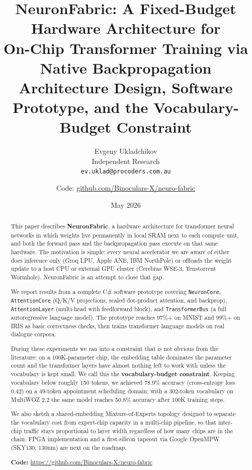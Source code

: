 \documentclass[11pt]{article}
\title{\textbf{NeuronFabric: A Fixed-Budget Hardware Architecture for\\
On-Chip Transformer Training via Native Backpropagation}\\[0.5em]
\large Architecture Design, Software Prototype, and the Vocabulary-Budget Constraint}
\author{
  Evgeny Ukladchikov \\
  Independent Research \\
  \texttt{ev.uklad@procoders.com.au} \\
  \and
  Code: \href{https://github.com/Binoculars-X/neuro-fabric}{github.com/Binoculars-X/neuro-fabric}
}
\date{May 2026}
\begin{document}
\maketitle

\begin{abstract}
This paper describes \textbf{NeuronFabric}, a hardware architecture for transformer
neural networks in which weights live permanently in local SRAM next to each compute
unit, and both the forward pass and the backpropagation pass execute on that same
hardware. The motivation is simple: every neural accelerator we are aware of either
does inference only (Groq LPU, Apple ANE, IBM NorthPole) or offloads the weight
update to a host CPU or external GPU cluster (Cerebras WSE-3, Tenstorrent Wormhole).
NeuronFabric is an attempt to close that gap.

We report results from a complete C\# software prototype covering \texttt{NeuronCore},
\texttt{AttentionCore} (Q/K/V projections, scaled dot-product attention, and backprop),
\texttt{AttentionLayer} (multi-head with feedforward block), and \texttt{TransformerBus}
(a full autoregressive language model). The prototype reaches 97\%+ on MNIST and
99\%+ on IRIS as basic correctness checks, then trains transformer language models
on real dialogue corpora.

During these experiments we ran into a constraint that is not obvious from the
literature: on a 100K-parameter chip, the embedding table dominates the parameter
count and the transformer layers have almost nothing left to work with unless the
vocabulary is kept small. We call this the \textbf{vocabulary-budget constraint}.
Keeping vocabulary below roughly 150 tokens, we achieved 78.9\% accuracy
(cross-entropy loss 0.42) on a 49-token appointment scheduling domain;
with a 302-token vocabulary on MultiWOZ 2.2 the same model reaches 50.8\%
accuracy after 100K training steps.

We also sketch a shared-embedding Mixture-of-Experts topology designed to separate
the vocabulary cost from expert-chip capacity in a multi-chip pipeline, so that
inter-chip traffic stays proportional to layer width regardless of how many chips
are in the chain. FPGA implementation and a first-silicon tapeout via Google OpenMPW
(SKY130, 130nm) are next on the roadmap.

\textbf{Code:} \url{https://github.com/Binoculars-X/neuro-fabric}
\end{abstract}

\end{document}
